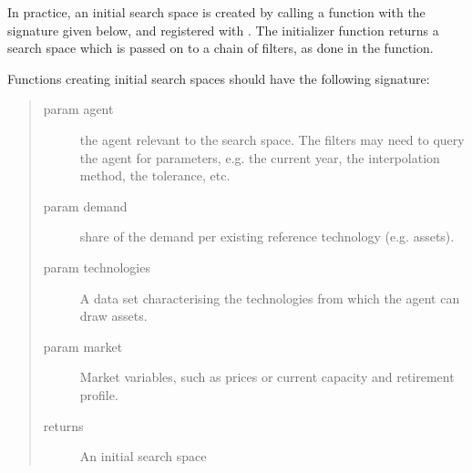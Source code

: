 \documentclass[letterpaper,10pt,english]{sphinxmanual}
\begin{document}
In practice, an initial search space is created by calling a function with the signature
given below, and registered with . The initializer
function returns a search space which is passed on to a chain of filters, as done in the
 function.

Functions creating initial search spaces should have the following signature:

\begin{sphinxVerbatim}[commandchars=\\\{\}]
 
     
     
     
     
  
\end{sphinxVerbatim}
\begin{quote}\begin{description}
\item[{param agent}] \leavevmode
the agent relevant to the search space. The filters may need to query
the agent for parameters, e.g. the current year, the interpolation
method, the tolerance, etc.

\item[{param demand}] \leavevmode
share of the demand per existing reference technology (e.g.
assets).

\item[{param technologies}] \leavevmode
A data set characterising the technologies from which the
agent can draw assets.

\item[{param market}] \leavevmode
Market variables, such as prices or current capacity and retirement
profile.

\item[{returns}] \leavevmode
An initial search space

\end{description}\end{quote}
\end{document}
